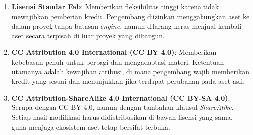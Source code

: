 \begin{enumerate}
    \item \textbf{Lisensi Standar Fab}: Memberikan fleksibilitas tinggi karena tidak mewajibkan pemberian kredit. Pengembang diizinkan menggabungkan aset ke dalam proyek tanpa batasan \textit{engine}, namun dilarang keras menjual kembali aset secara terpisah di luar proyek yang dibangun.

    \item \textbf{CC Attribution 4.0 International (CC BY 4.0)}: Memberikan kebebasan penuh untuk berbagi dan mengadaptasi materi. Ketentuan utamanya adalah kewajiban atribusi, di mana pengembang wajib memberikan kredit yang sesuai dan menunjukkan jika terdapat perubahan pada aset asli.

    \item \textbf{CC Attribution-ShareAlike 4.0 International (CC BY-SA 4.0)}: Serupa dengan CC BY 4.0, namun dengan tambahan klausul \textit{ShareAlike}. Setiap hasil modifikasi harus didistribusikan di bawah lisensi yang sama, guna menjaga ekosistem aset tetap bersifat terbuka.
\end{enumerate}